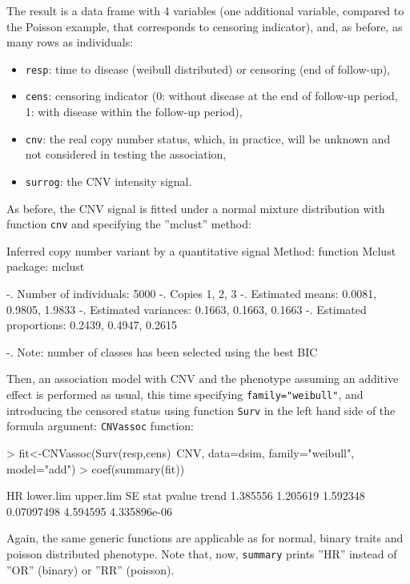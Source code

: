 \documentclass[11pt]{article}
\begin{document}
The result is a data frame with 4 variables (one additional variable, compared to the Poisson example, that corresponds to censoring indicator), 
and, as before, as many rows as individuals:
\begin{itemize}
\item \texttt{resp}: time to disease (weibull distributed) or censoring (end of follow-up),
\item \texttt{cens}: censoring indicator (0: without disease at the end of follow-up period, 1: with disease within the follow-up period),
\item \texttt{cnv}: the real copy number status, which, in practice, will be unknown and not considered in testing the association,
\item \texttt{surrog}: the CNV intensity signal.
\end{itemize}

As before, the CNV signal is fitted under a normal mixture distribution with function \texttt{cnv}
and specifying the ''mclust'' method:
\begin{Schunk}
\begin{Soutput}
Inferred copy number variant by a quantitative signal
   Method: function Mclust {package: mclust}  

-. Number of individuals: 5000 
-. Copies 1, 2, 3 
-. Estimated means: 0.0081, 0.9805, 1.9833 
-. Estimated variances: 0.1663, 0.1663, 0.1663 
-. Estimated proportions: 0.2439, 0.4947, 0.2615 


-. Note: number of classes has been selected using the best BIC
\end{Soutput}
\end{Schunk}

Then, an association model with CNV and the phenotype assuming an additive effect is performed as usual,
this time specifying \texttt{family="weibull"}, and introducing the censored status using function \texttt{Surv}
in the left hand side of the formula argument:
\texttt{CNVassoc} function:
\begin{Schunk}
\begin{Sinput}
> fit<-CNVassoc(Surv(resp,cens)~CNV, data=dsim, family="weibull", model="add")
> coef(summary(fit))
\end{Sinput}
\begin{Soutput}
            HR lower.lim upper.lim         SE     stat       pvalue
trend 1.385556  1.205619  1.592348 0.07097498 4.594595 4.335896e-06
\end{Soutput}
\end{Schunk}

Again, the same generic functions are applicable as for normal, binary traits and poisson distributed phenotype. 
Note that, now, \texttt{summary} prints ''HR'' instead of ''OR'' (binary) or ''RR'' (poisson).








\end{document}
